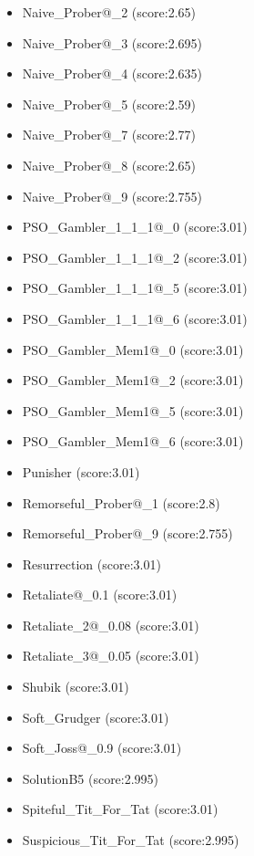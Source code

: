 \begin{appendices}
\begin{itemize}
\begin{multicols}{3}
\begin{itemize}
                \item Naive\_Prober@\_2 (score:2.65)
                \item Naive\_Prober@\_3 (score:2.695)
                \item Naive\_Prober@\_4 (score:2.635)
                \item Naive\_Prober@\_5 (score:2.59)
                \item Naive\_Prober@\_7 (score:2.77)
                \item Naive\_Prober@\_8 (score:2.65)
                \item Naive\_Prober@\_9 (score:2.755)
                \item PSO\_Gambler\_1\_1\_1@\_0 (score:3.01)
                \item PSO\_Gambler\_1\_1\_1@\_2 (score:3.01)
                \item PSO\_Gambler\_1\_1\_1@\_5 (score:3.01)
                \item PSO\_Gambler\_1\_1\_1@\_6 (score:3.01)
                \item PSO\_Gambler\_Mem1@\_0 (score:3.01)
                \item PSO\_Gambler\_Mem1@\_2 (score:3.01)
                \item PSO\_Gambler\_Mem1@\_5 (score:3.01)
                \item PSO\_Gambler\_Mem1@\_6 (score:3.01)
                \item Punisher (score:3.01)
                \item Remorseful\_Prober@\_1 (score:2.8)
                \item Remorseful\_Prober@\_9 (score:2.755)
                \item Resurrection (score:3.01)
                \item Retaliate@\_0.1 (score:3.01)
                \item Retaliate\_2@\_0.08 (score:3.01)
                \item Retaliate\_3@\_0.05 (score:3.01)
                \item Shubik (score:3.01)
                \item Soft\_Grudger (score:3.01)
                \item Soft\_Joss@\_0.9 (score:3.01)
                \item SolutionB5 (score:2.995)
                \item Spiteful\_Tit\_For\_Tat (score:3.01)
                \item Suspicious\_Tit\_For\_Tat (score:2.995)

\end{itemize}
\end{multicols}
\end{itemize}
\end{appendices}
